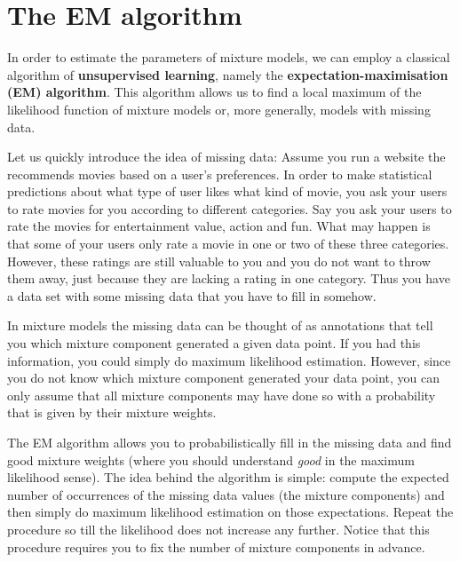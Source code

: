 \section{The EM algorithm}

In order to estimate the parameters of mixture models, we can employ a classical algorithm of 
\textbf{unsupervised learning}, namely the \textbf{expectation-maximisation (EM) algorithm}. This
algorithm allows us to find a local maximum of the likelihood function of mixture models or, more
generally, models with missing data. 

Let us quickly introduce the idea of missing data: Assume you run a website the recommends movies
based on a user's preferences. In order to make statistical predictions about what type of user
likes what kind of movie, you ask your users to rate movies for you according to different categories.
Say you ask your users to rate the movies for entertainment value, action and fun. What may happen is
that some of your users only rate a movie in one or two of these three categories. However, these
ratings are still valuable to you and you do not want to throw them away, just because they are lacking
a rating in one category. Thus you have a data set with some missing data that you have to fill in somehow.

In mixture models the missing data can be thought of as annotations that tell you which mixture component
generated a given data point. If you had this information, you could simply do maximum likelihood estimation.
However, since you do not know which mixture component generated your data point, you can only
assume that all mixture components may have done so with a probability that is given by their mixture
weights. 

The EM algorithm allows you to probabilistically fill in the missing data and find good mixture weights
(where you should understand \textit{good} in the maximum likelihood sense). The idea behind the
algorithm is simple: compute the expected number of occurrences of the missing data values (the mixture 
components) and then simply do maximum likelihood estimation on those expectations. Repeat the procedure 
so till the likelihood does not increase any further. Notice that this procedure requires you to
fix the number of mixture components in advance.

